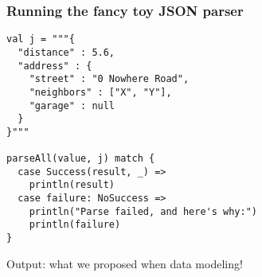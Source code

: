 \begin{frame}[fragile]
  \frametitle{Running the fancy toy JSON parser}

  \begin{verbatim}
val j = """{
  "distance" : 5.6,
  "address" : {
    "street" : "0 Nowhere Road",
    "neighbors" : ["X", "Y"],
    "garage" : null
  }
}"""

parseAll(value, j) match {
  case Success(result, _) =>
    println(result)
  case failure: NoSuccess =>
    println("Parse failed, and here's why:")
    println(failure)
}
  \end{verbatim}

  Output: what we proposed when data modeling!
\end{frame}

